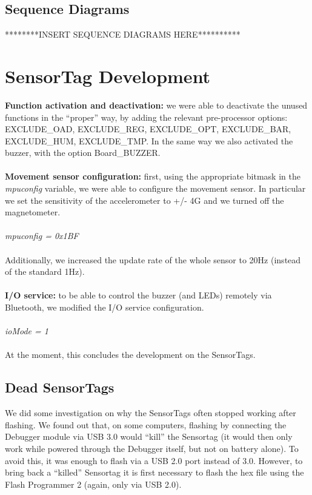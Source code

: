 \documentclass[conference,12pt]{IEEETran}
\begin{document}
\subsection{Sequence Diagrams}
********INSERT SEQUENCE DIAGRAMS HERE**********

\section{SensorTag Development}
\textbf{Function activation and deactivation:} we were able to deactivate the unused functions in the “proper” way, by adding the relevant pre-processor options: EXCLUDE\_OAD, EXCLUDE\_REG, EXCLUDE\_OPT, EXCLUDE\_BAR, EXCLUDE\_HUM, EXCLUDE\_TMP. In the same way we also activated the buzzer, with the option  Board\_BUZZER.\\\\
\textbf{Movement sensor configuration:} first, using the appropriate bitmask in the \textit{mpuconfig} variable, we were able to configure the movement sensor. In particular we set the sensitivity of the accelerometer to +/- 4G and we turned off the magnetometer.\\\\
\textit{mpuconfig = 0x1BF}\\\\
Additionally, we increased the update rate of the whole sensor to 20Hz (instead of the standard 1Hz).\\\\
\textbf{I/O service:} to be able to control the buzzer (and LEDs) remotely via Bluetooth, we modified the I/O service configuration.\\\\
\textit{ioMode = 1}\\\\
At the moment, this concludes the development on the SensorTags.

\subsection{Dead SensorTags}
We did some investigation on why the SensorTags often stopped working after flashing. We found out that, on some computers, flashing by connecting the Debugger module via USB 3.0 would “kill” the Sensortag (it would then only work while powered through the Debugger itself, but not on battery alone). To avoid this, it was enough to flash via a USB 2.0 port instead of 3.0. However, to bring back a “killed” Sensortag it is first necessary to flash the hex file using the Flash Programmer 2 (again, only via USB 2.0).
\end{document}
